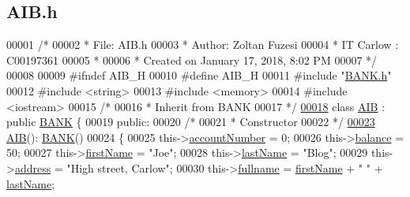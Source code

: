 \hypertarget{_a_i_b_8h_source}{}\subsection{A\+I\+B.\+h}

\begin{DoxyCode}
00001 \textcolor{comment}{/* }
00002 \textcolor{comment}{ * File:   AIB.h}
00003 \textcolor{comment}{ * Author: Zoltan Fuzesi}
00004 \textcolor{comment}{ * IT Carlow : C00197361}
00005 \textcolor{comment}{ *}
00006 \textcolor{comment}{ * Created on January 17, 2018, 8:02 PM}
00007 \textcolor{comment}{ */}
00008 
00009 \textcolor{preprocessor}{#ifndef AIB\_H}
00010 \textcolor{preprocessor}{#define AIB\_H}
00011 \textcolor{preprocessor}{#include "\hyperlink{_b_a_n_k_8h}{BANK.h}"}
00012 \textcolor{preprocessor}{#include <string>}
00013 \textcolor{preprocessor}{#include <memory>}
00014 \textcolor{preprocessor}{#include <iostream>}
00015 \textcolor{comment}{/*}
00016 \textcolor{comment}{ * Inherit from BANK}
00017 \textcolor{comment}{ */}
\hypertarget{_a_i_b_8h_source.tex_l00018}{}\hyperlink{class_a_i_b}{00018} \textcolor{keyword}{class }\hyperlink{class_a_i_b}{AIB} : \textcolor{keyword}{public} \hyperlink{class_b_a_n_k}{BANK} \{
00019 \textcolor{keyword}{public}:
00020     \textcolor{comment}{/*}
00021 \textcolor{comment}{     * Constructor}
00022 \textcolor{comment}{     */}
\hypertarget{_a_i_b_8h_source.tex_l00023}{}\hyperlink{class_a_i_b_a4783110463bf12f937a85b62455faf38_a4783110463bf12f937a85b62455faf38}{00023}     \hyperlink{class_a_i_b_a4783110463bf12f937a85b62455faf38_a4783110463bf12f937a85b62455faf38}{AIB}(): \hyperlink{class_b_a_n_k}{BANK}()
00024     \{
00025         this->\hyperlink{class_a_i_b_aafc08efeec5b8c800c32ee32f20603a7_aafc08efeec5b8c800c32ee32f20603a7}{accountNumber} = 0;
00026         this->\hyperlink{class_a_i_b_a3c8d637bd997c1f062d844a88e2559ba_a3c8d637bd997c1f062d844a88e2559ba}{balance} = 50;
00027         this->\hyperlink{class_a_i_b_a869f72057cb63ebf0cfd257069e15c7c_a869f72057cb63ebf0cfd257069e15c7c}{firstName} = \textcolor{stringliteral}{"Joe"};
00028         this->\hyperlink{class_a_i_b_ace7b8b648d1b44b7ee2f4be002952b7a_ace7b8b648d1b44b7ee2f4be002952b7a}{lastName} = \textcolor{stringliteral}{"Blog"};
00029         this->\hyperlink{class_a_i_b_ae6a67cc33d1e5fa83a52a238e45ca3dc_ae6a67cc33d1e5fa83a52a238e45ca3dc}{address} = \textcolor{stringliteral}{"High street, Carlow"};
00030         this->\hyperlink{class_a_i_b_a818b0cc283af23127c067fb3fc751058_a818b0cc283af23127c067fb3fc751058}{fullname} = \hyperlink{class_a_i_b_a869f72057cb63ebf0cfd257069e15c7c_a869f72057cb63ebf0cfd257069e15c7c}{firstName} + \textcolor{stringliteral}{" "} + \hyperlink{class_a_i_b_ace7b8b648d1b44b7ee2f4be002952b7a_ace7b8b648d1b44b7ee2f4be002952b7a}{lastName};

\end{DoxyCode}
